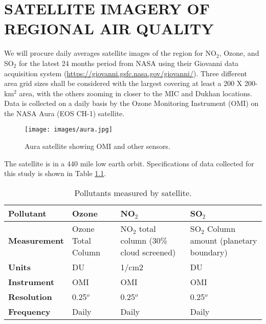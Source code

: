 \chapter{SATELLITE IMAGERY OF REGIONAL AIR QUALITY}

We will procure daily averages satellite images of the region for NO$_{2}$, Ozone, and SO$_{2}$ for the latest 24 months period from NASA using their Giovanni data acquisition system (\url{https://giovanni.gsfc.nasa.gov/giovanni/}).  Three different area grid sizes shall be considered with the largest covering at least a 200 X 200-km$^{2}$ area, with the others zooming in closer to the MIC and Dukhan locations.\\

Data is collected on a daily basis by the Ozone Monitoring Instrument (OMI) on the NASA Aura (EOS CH-1) satellite. 


\begin{figure}[H]
\centering
\texttt{[image: images/aura.jpg]} 
\caption{Aura satellite showing OMI and other sensors.}
\label{fig:aura}
\end{figure}
%


The satellite is in a 440 mile low earth orbit. Specifications of data collected for this study is shown in Table \ref{tab:omi}.

\begin{table}[H]
\centering
\caption{Pollutants measured by satellite.}
\label{tab:omi}
\begin{tabular}{@{}|l|p{3cm}p{3cm}p{3cm}@{}}
\toprule
\textbf{Pollutant} & \textbf{Ozone} & \textbf{NO$_{2}$} & \textbf{SO$_{2}$} \\ \midrule
\textbf{Measurement} & Ozone Total Column & NO$_{2}$ total column (30\% cloud screened) & SO$_{2}$ Column amount (planetary boundary) \\ \cmidrule(r){1-1}
\textbf{Units} & DU & 1/cm2 & DU \\ \cmidrule(r){1-1}
\textbf{Instrument} & OMI & OMI & OMI \\ \cmidrule(r){1-1}
\textbf{Resolution} & 0.25$^{o}$ & 0.25$^{o}$ & 0.25$^{o}$ \\ \cmidrule(r){1-1}
\textbf{Frequency} & Daily & Daily & Daily \\ \bottomrule
\end{tabular}
\end{table}


